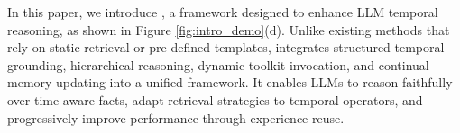


In this paper, we introduce \textbf{\mot}, a  framework designed to enhance LLM temporal reasoning, as shown in Figure \ref{fig:intro_demo}(d).  
Unlike existing methods that rely on static retrieval or pre-defined templates, \mot integrates structured temporal grounding, hierarchical reasoning, dynamic toolkit invocation, and continual memory updating into a unified framework.  
It enables LLMs to reason faithfully over time-aware facts, adapt retrieval strategies to temporal operators, and progressively improve performance through experience reuse.  



